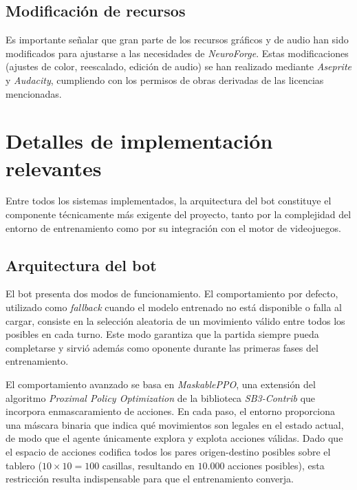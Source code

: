 \subsection{Modificación de recursos}

Es importante señalar que gran parte de los recursos gráficos y de audio han sido modificados para ajustarse a las necesidades de \textit{NeuroForge}. Estas modificaciones (ajustes de color, reescalado, edición de audio) se han realizado mediante \textit{Aseprite} y \textit{Audacity}, cumpliendo con los permisos de obras derivadas de las licencias mencionadas.

\section{Detalles de implementación relevantes}

Entre todos los sistemas implementados, la arquitectura del bot constituye el componente técnicamente más exigente del proyecto, tanto por la complejidad del entorno de entrenamiento como por su integración con el motor de videojuegos.

\subsection{Arquitectura del bot}

El bot presenta dos modos de funcionamiento. El comportamiento por defecto, utilizado como \textit{fallback} cuando el modelo entrenado no está disponible o falla al cargar, consiste en la selección aleatoria de un movimiento válido entre todos los posibles en cada turno. Este modo garantiza que la partida siempre pueda completarse y sirvió además como oponente durante las primeras fases del entrenamiento.

El comportamiento avanzado se basa en \textit{MaskablePPO}, una extensión del algoritmo \textit{Proximal Policy Optimization} de la biblioteca \textit{SB3-Contrib} que incorpora enmascaramiento de acciones. En cada paso, el entorno proporciona una máscara binaria que indica qué movimientos son legales en el estado actual, de modo que el agente únicamente explora y explota acciones válidas. Dado que el espacio de acciones codifica todos los pares origen-destino posibles sobre el tablero ($10 \times 10 = 100$ casillas, resultando en $10.000$ acciones posibles), esta restricción resulta indispensable para que el entrenamiento converja.

